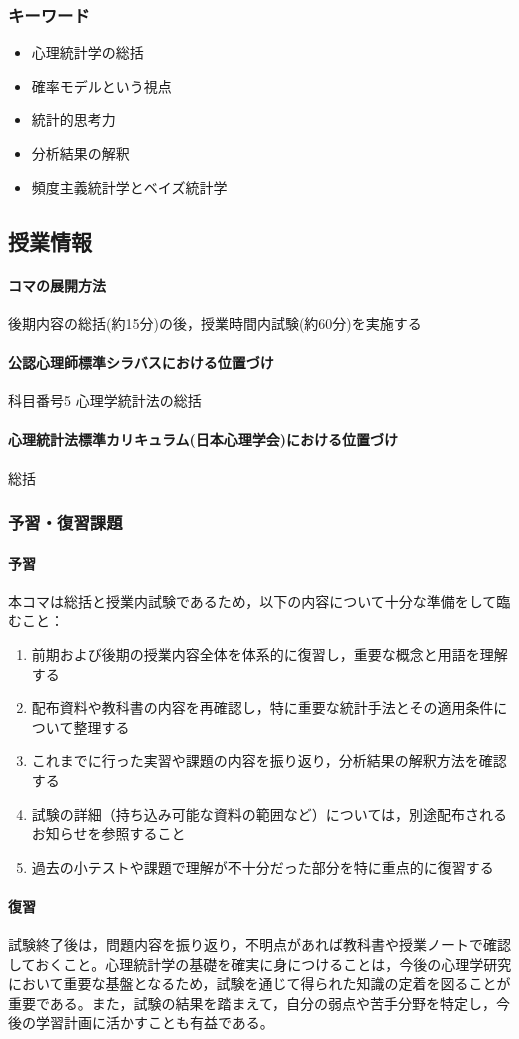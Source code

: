 \subsubsection{キーワード}
\begin{itemize}
	\item 心理統計学の総括
	\item 確率モデルという視点
	\item 統計的思考力
	\item 分析結果の解釈
	\item 頻度主義統計学とベイズ統計学
\end{itemize}
\subsection{授業情報}
\paragraph{コマの展開方法}
後期内容の総括(約15分)の後，授業時間内試験(約60分)を実施する
\paragraph{公認心理師標準シラバスにおける位置づけ}
科目番号5 心理学統計法の総括
\paragraph{心理統計法標準カリキュラム(日本心理学会)における位置づけ}
総括
\subsubsection{予習・復習課題}
\paragraph{予習}
本コマは総括と授業内試験であるため，以下の内容について十分な準備をして臨むこと：

\begin{enumerate}
\item 前期および後期の授業内容全体を体系的に復習し，重要な概念と用語を理解する
\item 配布資料や教科書の内容を再確認し，特に重要な統計手法とその適用条件について整理する
\item これまでに行った実習や課題の内容を振り返り，分析結果の解釈方法を確認する
\item 試験の詳細（持ち込み可能な資料の範囲など）については，別途配布されるお知らせを参照すること
\item 過去の小テストや課題で理解が不十分だった部分を特に重点的に復習する
\end{enumerate}

\paragraph{復習}
試験終了後は，問題内容を振り返り，不明点があれば教科書や授業ノートで確認しておくこと。心理統計学の基礎を確実に身につけることは，今後の心理学研究において重要な基盤となるため，試験を通じて得られた知識の定着を図ることが重要である。また，試験の結果を踏まえて，自分の弱点や苦手分野を特定し，今後の学習計画に活かすことも有益である。
